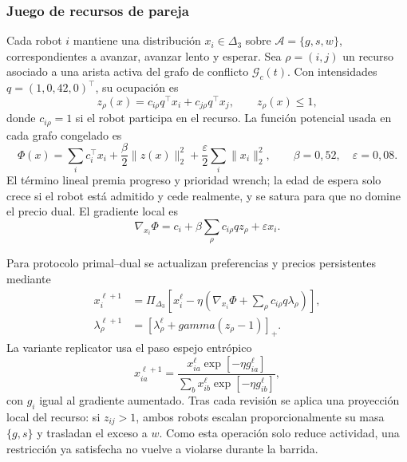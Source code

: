 \subsubsection{Juego de recursos de pareja}

Cada robot $i$ mantiene una distribución
$x_i\in\Delta_3$ sobre $\mathcal A=\{g,s,w\}$, correspondientes a avanzar,
avanzar lento y esperar. Sea $\rho=(i,j)$ un recurso asociado a una arista activa del
grafo de conflicto $\mathcal G_c(t)$. Con intensidades
$q=(1,0{,}42,0)^\top$, su ocupación es
\begin{equation}
 z_\rho(x)=c_{i\rho}q^\top x_i+c_{j\rho}q^\top x_j,
 \qquad z_\rho(x)\leq 1,
 \label{eq:sp4-pair-capacity}
\end{equation}
donde $c_{i\rho}=1$ si el robot participa en el recurso. La función potencial usada en
cada grafo congelado es
\begin{equation}
 \Phi(x)=\sum_i c_i^\top x_i+
 \frac{\beta}{2}\lVert z(x)\rVert_2^2+
 \frac{\varepsilon}{2}\sum_i\lVert x_i\rVert_2^2,
 \qquad \beta=0{,}52,\quad\varepsilon=0{,}08.
 \label{eq:sp4-potential}
\end{equation}
El término lineal premia progreso y prioridad wrench; la edad de espera solo crece si el
robot está admitido y cede realmente, y se satura para que no domine el precio dual.
El gradiente local es
\begin{equation}
 \nabla_{x_i}\Phi=c_i+\beta\sum_\rho c_{i\rho}qz_\rho+
 \varepsilon x_i.
 \label{eq:sp4-gradient}
\end{equation}

Para protocolo primal--dual se actualizan preferencias y precios persistentes mediante
\begin{align}
 x_i^{\ell+1}&=\Pi_{\Delta_3}\!\left[x_i^\ell-\eta
 \left(\nabla_{x_i}\Phi+\sum_\rho c_{i\rho}q\lambda_\rho\right)\right],\\
 \lambda_\rho^{\ell+1}&=\left[\lambda_\rho^\ell+gamma
 (z_\rho-1)\right]_+.
 \label{eq:sp4-pd}
\end{align}
La variante replicator usa el paso espejo entrópico
\begin{equation}
 x_{ia}^{\ell+1}=\frac{x_{ia}^{\ell}
 \exp[-\eta g_{ia}^{\ell}]}{\sum_bx_{ib}^{\ell}
 \exp[-\eta g_{ib}^{\ell}]},
 \label{eq:sp4-replicator}
\end{equation}
con $g_i$ igual al gradiente aumentado. Tras cada revisión se aplica una proyección
local del recurso: si $z_{ij}>1$, ambos robots escalan proporcionalmente su masa
$\{g,s\}$ y trasladan el exceso a $w$. Como esta operación solo reduce actividad, una
restricción ya satisfecha no vuelve a violarse durante la barrida.

